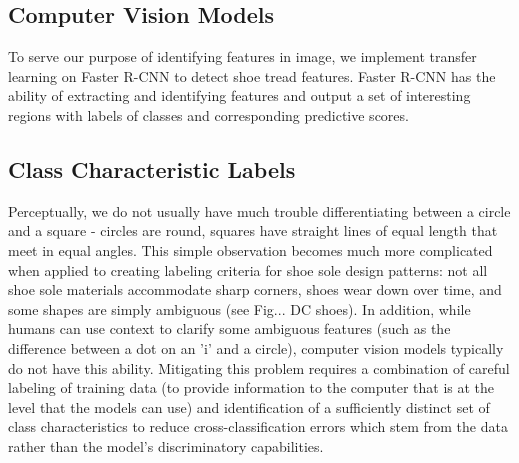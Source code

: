 \documentclass[10pt]{article}
\newcommand{\svp}[1]{{\textcolor{RedOrange}{#1}}}
\begin{document}
\subsection{Computer Vision Models}


To serve our purpose of identifying features in image, we implement transfer learning on Faster R-CNN to detect shoe tread features. Faster R-CNN has the ability of extracting and identifying features and output a set of interesting regions with labels of classes and corresponding predictive scores.  


\subsection{Class Characteristic Labels}\label{sec:classification-scheme}
\svp{Perceptually, we do not usually have much trouble differentiating between a circle and a square - circles are round, squares have straight lines of equal length that meet in equal angles. This simple observation becomes much more complicated when applied to creating labeling criteria for shoe sole design patterns: not all shoe sole materials accommodate sharp corners, shoes wear down over time, and some shapes are simply ambiguous (see Fig... DC shoes). In addition, while humans can use context to clarify some ambiguous features (such as the difference between a dot on an 'i' and a circle), computer vision models typically do not have this ability. Mitigating this problem requires a combination of careful labeling of training data (to provide information to the computer that is at the level that the models can use) and identification of a sufficiently distinct set of class characteristics to reduce cross-classification errors which stem from the data rather than the model's discriminatory capabilities.}

\end{document}
